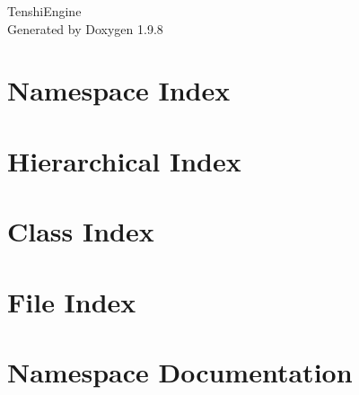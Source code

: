\documentclass[twoside]{book}
\newcommand{\+}{\discretionary{\mbox{\scriptsize$\hookleftarrow$}}{}{}}
\newcommand{\clearemptydoublepage}{%
    \newpage{\pagestyle{empty}\cleardoublepage}%
  }
\begin{document}
  \raggedbottom
    \hypersetup{pageanchor=false,
                bookmarksnumbered=true,
                pdfencoding=unicode
               }
  \begin{titlepage}
  \vspace*{7cm}
  \begin{center}%
  {\Large Tenshi\+Engine}\\
  \vspace*{1cm}
  {\large Generated by Doxygen 1.9.8}\\
  \end{center}
  \end{titlepage}
  \clearemptydoublepage
  \tableofcontents
  \clearemptydoublepage
  \hypersetup{pageanchor=true}
\chapter{Namespace Index}

\chapter{Hierarchical Index}

\chapter{Class Index}

\chapter{File Index}

\chapter{Namespace Documentation}



\end{document}
